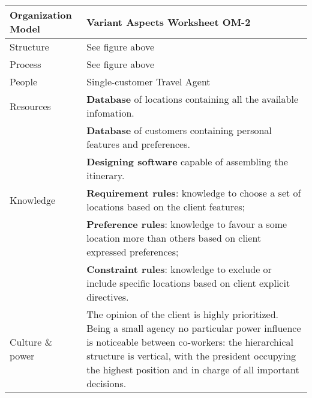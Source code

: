 \begin{tabular}%
       {|p{3cm}%
        |p{9.5cm}|}
\hline
{\bf Organization Model} &
   {\bf Variant Aspects Worksheet OM-2} \\
\hline
\hline
\sc Structure &
   {\rm
   See figure above
   } \\ %
\hline
\sc Process &
   {\rm
   See figure above
   } \\ %
\hline
\sc People &
   {\rm
   Single-customer Travel Agent
   } \\
\hline
\sc Resources &
   {\rm \textbf{Database} of locations containing all the available infomation.} \\
 & {\rm \textbf{Database} of customers containing personal features and preferences.} \\
 & {\rm \textbf{Designing software} capable of assembling the itinerary.} \\
\hline
\sc Knowledge &
   {\rm \textbf{Requirement rules}: knowledge to choose a set of locations based on the client features;} \\
 & {\rm \textbf{Preference rules}: knowledge to favour a some location more than others based on client expressed preferences;}\\
 & {\rm \textbf{Constraint rules}: knowledge to exclude or include specific locations based on client explicit directives.}\\
\hline
\sc Culture \& power &
   {\rm The opinion of the client is highly prioritized. Being a small agency no particular power influence is noticeable between co-workers: the hierarchical structure is vertical, with the president occupying the highest position and in charge of all important decisions.} \\
\hline
\end{tabular}
